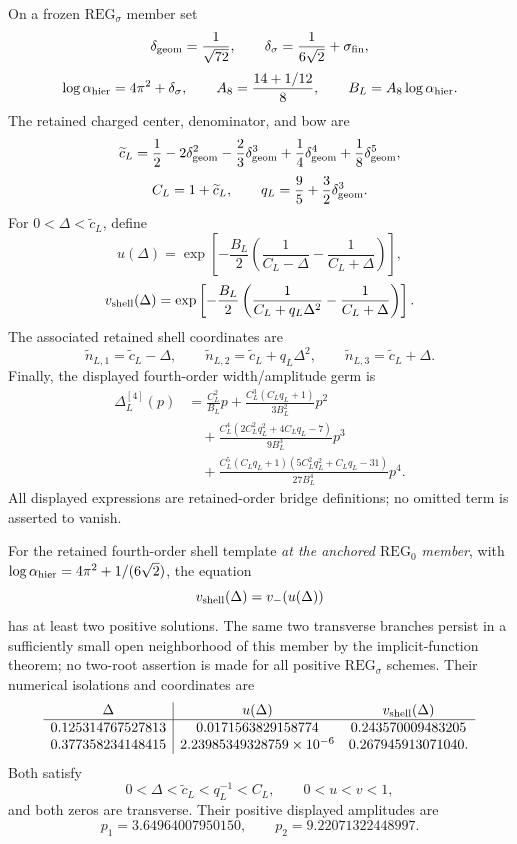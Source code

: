 \documentclass[12pt,a4paper]{article}
\begin{document}
\begin{definition}
\label{p6:def:charged-shell-template}
On a frozen \(\mathrm{REG}_{\sigma}\) member set
\[
\delta_{\rm geom}=\frac1{\sqrt{72}},
\qquad
\delta_{\sigma}=\frac1{6\sqrt2}+\sigma_{\rm fin},
\]
\[
\log\alpha_{\rm hier}=4\pi^2+\delta_{\sigma},
\qquad
A_8=\frac{14+1/12}{8},
\qquad
B_L=A_8\log\alpha_{\rm hier}.
\]
The retained charged center, denominator, and bow are
\[
\widetilde c_L
=
\frac12-2\delta_{\rm geom}^2
-\frac23\delta_{\rm geom}^3
+\frac14\delta_{\rm geom}^4
+\frac18\delta_{\rm geom}^5,
\]
\[
C_L=1+\widetilde c_L,
\qquad
q_L=\frac95+\frac32\delta_{\rm geom}^3.
\]
For \(0<\Delta<\widetilde c_L\), define
\[
u(\Delta)
=
\exp\left[
-\frac{B_L}{2}
\left(
\frac1{C_L-\Delta}-\frac1{C_L+\Delta}
\right)
\right],
\]
\[
v_{\rm shell}(\Delta)
=
\exp\left[
-\frac{B_L}{2}
\left(
\frac1{C_L+q_L\Delta^2}-\frac1{C_L+\Delta}
\right)
\right].
\]
The associated retained shell coordinates are
\[
\widetilde n_{L,1}=\widetilde c_L-\Delta,
\qquad
\widetilde n_{L,2}=\widetilde c_L+q_L\Delta^2,
\qquad
\widetilde n_{L,3}=\widetilde c_L+\Delta.
\]
Finally, the displayed fourth-order width/amplitude germ is
\[
\begin{aligned}
\Delta_L^{[4]}(p)
&=
\frac{C_L^2}{B_L}p
+\frac{C_L^3(C_Lq_L+1)}{3B_L^2}p^2\\
&\quad
+\frac{C_L^4(2C_L^2q_L^2+4C_Lq_L-7)}
{9B_L^3}p^3\\
&\quad
+\frac{C_L^5(C_Lq_L+1)
(5C_L^2q_L^2+C_Lq_L-31)}
{27B_L^4}p^4 .
\end{aligned}
\]
All displayed expressions are retained-order bridge definitions; no omitted
term is asserted to vanish.
\end{definition}

\begin{theorem}
\label{p6:thm:two-koide-intersections}
For the retained fourth-order shell template \emph{at the anchored
\(\mathrm{REG}_0\) member}, with
\(\log\alpha_{\rm hier}=4\pi^2+1/(6\sqrt2)\), the equation
\[
v_{\rm shell}(\Delta)=v_-(u(\Delta))
\]
has at least two positive solutions. The same two transverse branches
persist in a sufficiently small open neighborhood of this member by the
implicit-function theorem; no two-root assertion is made for all positive
\(\mathrm{REG}_\sigma\) schemes.  Their numerical isolations and
coordinates are
\[
\begin{array}{c|cc}
\Delta&u(\Delta)&v_{\rm shell}(\Delta)\\
\hline
0.125314767527813&
0.0171563829158774&
0.243570009483205\\
0.377358234148415&
2.23985349328759\times10^{-6}&
0.267945913071040 .
\end{array}
\]
Both satisfy
\[
0<\Delta<\widetilde c_L<q_L^{-1}<C_L,
\qquad
0<u<v<1,
\]
and both zeros are transverse.  Their positive displayed amplitudes are
\[
p_1=3.64964007950150,
\qquad
p_2=9.22071322448997.
\]
\end{theorem}
\end{document}
